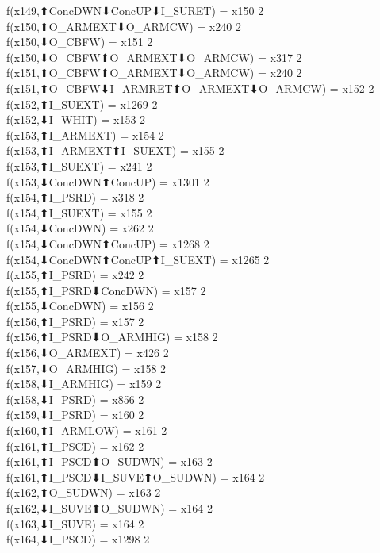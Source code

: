 f(x149,⬆ConcDWN⬇ConcUP⬇I_SURET) = x150 {2} \\
f(x150,⬆O_ARMEXT⬇O_ARMCW) = x240 {2} \\
f(x150,⬇O_CBFW) = x151 {2} \\
f(x150,⬇O_CBFW⬆O_ARMEXT⬇O_ARMCW) = x317 {2} \\
f(x151,⬆O_CBFW⬆O_ARMEXT⬇O_ARMCW) = x240 {2} \\
f(x151,⬆O_CBFW⬇I_ARMRET⬆O_ARMEXT⬇O_ARMCW) = x152 {2} \\
f(x152,⬆I_SUEXT) = x1269 {2} \\
f(x152,⬇I_WHIT) = x153 {2} \\
f(x153,⬆I_ARMEXT) = x154 {2} \\
f(x153,⬆I_ARMEXT⬆I_SUEXT) = x155 {2} \\
f(x153,⬆I_SUEXT) = x241 {2} \\
f(x153,⬇ConcDWN⬆ConcUP) = x1301 {2} \\
f(x154,⬆I_PSRD) = x318 {2} \\
f(x154,⬆I_SUEXT) = x155 {2} \\
f(x154,⬇ConcDWN) = x262 {2} \\
f(x154,⬇ConcDWN⬆ConcUP) = x1268 {2} \\
f(x154,⬇ConcDWN⬆ConcUP⬆I_SUEXT) = x1265 {2} \\
f(x155,⬆I_PSRD) = x242 {2} \\
f(x155,⬆I_PSRD⬇ConcDWN) = x157 {2} \\
f(x155,⬇ConcDWN) = x156 {2} \\
f(x156,⬆I_PSRD) = x157 {2} \\
f(x156,⬆I_PSRD⬇O_ARMHIG) = x158 {2} \\
f(x156,⬇O_ARMEXT) = x426 {2} \\
f(x157,⬇O_ARMHIG) = x158 {2} \\
f(x158,⬇I_ARMHIG) = x159 {2} \\
f(x158,⬇I_PSRD) = x856 {2} \\
f(x159,⬇I_PSRD) = x160 {2} \\
f(x160,⬆I_ARMLOW) = x161 {2} \\
f(x161,⬆I_PSCD) = x162 {2} \\
f(x161,⬆I_PSCD⬆O_SUDWN) = x163 {2} \\
f(x161,⬆I_PSCD⬇I_SUVE⬆O_SUDWN) = x164 {2} \\
f(x162,⬆O_SUDWN) = x163 {2} \\
f(x162,⬇I_SUVE⬆O_SUDWN) = x164 {2} \\
f(x163,⬇I_SUVE) = x164 {2} \\
f(x164,⬇I_PSCD) = x1298 {2} \\
